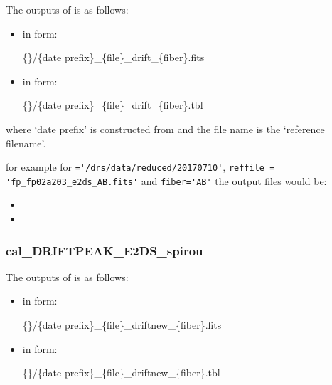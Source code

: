 The outputs of \calDRIFTE is as follows:

\begin{itemize}

\item {} in form:
\begin{tcustomdir}
\{\reduceddir\}/\{date prefix\}\_\{file\}\_drift\_\{fiber\}.fits
\end{tcustomdir}

\item {} in form:
\begin{tcustomdir}
\{\reduceddir\}/\{date prefix\}\_\{file\}\_drift\_\{fiber\}.tbl
\end{tcustomdir}

\end{itemize}


\noindent where `date prefix' is constructed from \argnightname and the file name is the `reference filename'.


\noindent for example for \reduceddir\lstinline[style=pythoninline]|='/drs/data/reduced/20170710'|, \lstinline[style=pythoninline]|reffile = 'fp_fp02a203_e2ds_AB.fits'| and \lstinline[style=pythoninline]|fiber='AB'| the output files would be:
\begin{tcustomdir}
\begin{itemize}
\item {}
\item {}
\end{itemize}
\end{tcustomdir}


\subsubsection{cal\_DRIFTPEAK\_E2DS\_spirou}

The outputs of \calDRIFTPEAK is as follows:

\begin{itemize}

\item {} in form:
\begin{tcustomdir}
\{\reduceddir\}/\{date prefix\}\_\{file\}\_driftnew\_\{fiber\}.fits
\end{tcustomdir}

\item {} in form:
\begin{tcustomdir}
\{\reduceddir\}/\{date prefix\}\_\{file\}\_driftnew\_\{fiber\}.tbl
\end{tcustomdir}

\end{itemize}


